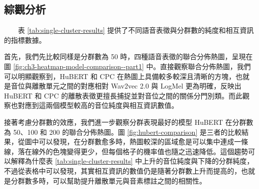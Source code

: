 \subsection{綜觀分析}

　　表 \ref{tab:single-cluster-results} 提供了不同語音表徵與分群數的純度和相互資訊的指標數據。

        首先，我們先比較同樣是分群數為 50 時，四種語音表徵的聯合分佈熱圖，呈現在圖 \ref{fig:ch3-heatmap-model-comparison--part1} 中。直接觀察聯合分佈熱圖，我們可以明顯觀察到，HuBERT 和 CPC 在熱圖上具備較多較深且清晰的方塊，也就是音位與離散單元之間的對應相對 Wav2vec 2.0 與 LogMel 更為明確，反映出 HuBERT 和 CPC 的離散表徵更擅長捕捉並對音位之間的關係分門別類。而此觀察也對應到這兩個模型較高的音位純度與相互資訊數值。

        接著考慮分群數的效應，我們進一步觀察分群表現最好的模型 HuBERT 在分群數為 50、100 和 200 的聯合分佈熱圖。圖 \ref{fig:hubert-comparison} 是三者的比較結果，從圖中可以發現，在分群數愈多時，熱圖較深的區域愈是可以集中連成一條線，落在線外的色塊變得更少，但每個格子的機率值也隨之迅速降低。這個趨勢可以解釋為什麼表 \ref{tab:single-cluster-results} 中上升的音位純度與下降的分群純度，不過從表格中可以發現，其實相互資訊的數值仍是隨著分群數上升而提高的，也就是分群數多時，可以幫助提升離散單元與音素標註之間的相關性。



